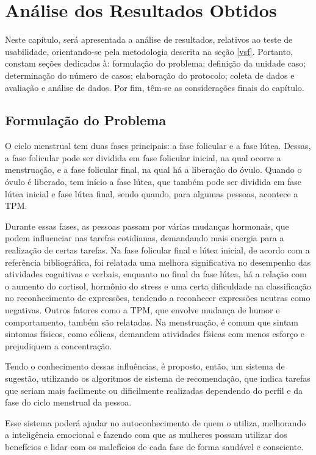 \chapter[Análise dos Resultados Obtidos]{Análise dos Resultados Obtidos}
\label{ch:capfinal}

Neste capítulo, será apresentada a análise de resultados, relativos ao teste de usabilidade, orientando-se pela metodologia 
descrita na seção \ref{vsf}. Portanto, constam seções dedicadas à: formulação do problema; definição da unidade 
caso; determinação do número de casos; elaboração do protocolo; coleta de dados e avaliação e análise de dados.
Por fim, têm-se as considerações finais do capítulo.

\section{Formulação do Problema}
O ciclo menstrual tem duas fases principais: a fase folicular e a fase lútea. Dessas, a fase folicular 
pode 
ser dividida em fase folicular inicial, na qual ocorre a menstruação, e a fase folicular final, na qual 
há a liberação do óvulo.
Quando o óvulo é liberado, tem início a fase lútea, que também pode ser dividida em fase lútea inicial e 
fase lútea final, sendo quando, para algumas pessoas, acontece a TPM.

Durante essas fases, as pessoas passam por várias mudanças hormonais, que podem influenciar nas tarefas 
cotidianas, demandando mais energia para a realização de certas tarefas. Na fase folicular final e lútea inicial, de acordo com a referência bibliográfica, 
foi relatada uma melhora significativa no desempenho das atividades cognitivas e verbais, enquanto no final da fase 
lútea, há a relação com o aumento do cortisol, hormônio do stress e uma certa dificuldade na classificação 
no reconhecimento de expressões, tendendo a reconhecer expressões neutras como negativas. Outros fatores como a TPM, que envolve
mudança de humor e comportamento, também são relatadas. Na menstruação, é comum que sintam sintomas físicos, como cólicas, demandem 
atividades físicas com menos esforço e prejudiquem a concentração. 

Tendo o conhecimento dessas influências, é proposto, então, um sistema de sugestão, utilizando os algoritmos de sistema de recomendação, 
que indica tarefas que seriam mais facilmente ou dificilmente realizadas dependendo do perfil e da fase do ciclo menstrual da pessoa.

Esse sistema poderá ajudar no autoconhecimento de quem o utiliza, melhorando a inteligência emocional e fazendo com que 
as mulheres possam utilizar dos benefícios e lidar com os malefícios de cada fase de forma saudável e consciente.

